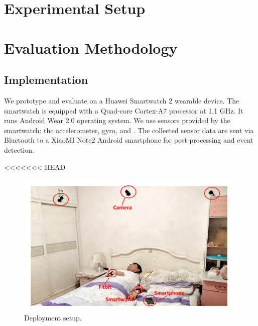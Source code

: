 \section{Experimental Setup}
\section{Evaluation Methodology}
\subsection{Implementation}
We prototype and evaluate \systemname on a Huawei Smartwatch 2 wearable device. The smartwatch is equipped with a Quad-core Cortex-A7
processor at 1.1 GHz.  It runs Android Wear 2.0 operating system. We use  sensors provided by the smartwatch: the
accelerometer, gyro, and . The collected sensor data are sent via Bluetooth to a XiaoMI Note2 Android smartphone for
post-processing and event detection.

<<<<<<< HEAD
\begin{figure}[!thbp]
	\centering
	\includegraphics[width=0.52\linewidth]{Figures/setup.pdf}
	\caption{Deployment setup.}\label{fig:setup}
\end{figure}

